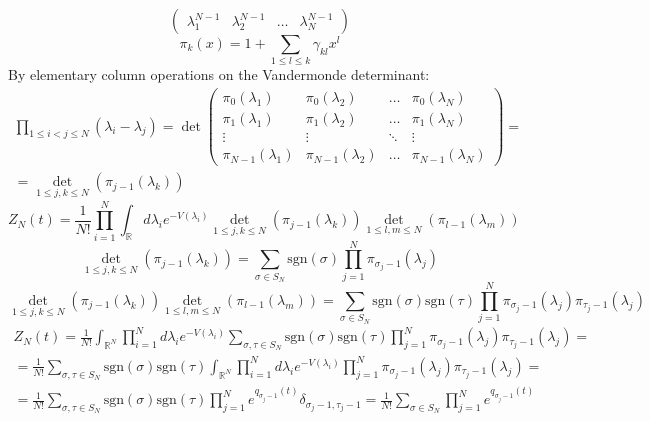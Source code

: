 \documentclass[12pt]{article}
\theoremstyle{definition}
\begin{document}
\begin{enumerate}
\begin{itemize}
\begin{equation}
\begin{pmatrix}
                \lambda^{N-1}_1 & \lambda^{N-1}_2 & \hdots & \lambda^{N-1}_N
            \end{pmatrix}
        \end{equation}
        \begin{equation}
            \pi_k(x)=1+\sum\limits_{1\leq l\leq k}\gamma_{kl}x^l
        \end{equation}
        By elementary column operations on the Vandermonde determinant:
        \begin{multline}
            \prod\limits_{1\leq i<j\leq N}(\lambda_i-\lambda_j)=\det\begin{pmatrix}
                \pi_0(\lambda_1) & \pi_0(\lambda_2) & \hdots & \pi_0(\lambda_N)\\
                \pi_1(\lambda_1) & \pi_1(\lambda_2) & \hdots & \pi_1(\lambda_N)\\
                \vdots & \vdots & \ddots & \vdots\\
                \pi_{N-1}(\lambda_1) & \pi_{N-1}(\lambda_2) & \hdots & \pi_{N-1}(\lambda_N)
            \end{pmatrix}=\\=\underset{1\leq j,k\leq N}{\det}(\pi_{j-1}(\lambda_k))
        \end{multline}
        \begin{equation}
            Z_N(t)=\frac{1}{N!}\prod\limits_{i=1}^N\int_{\mathbb{R}}d\lambda_ie^{-V(\lambda_i)}\underset{1\leq j,k\leq N}{\det}(\pi_{j-1}(\lambda_k))\underset{1\leq l,m\leq N}{\det}(\pi_{l-1}(\lambda_m))
        \end{equation}
        \begin{equation}
            \underset{1\leq j,k\leq N}{\det}(\pi_{j-1}(\lambda_k))=\sum\limits_{\sigma\in S_N}\text{sgn}(\sigma)\prod\limits_{j=1}^N\pi_{\sigma_j-1}(\lambda_j)
        \end{equation}
        \begin{equation}
            \underset{1\leq j,k\leq N}{\det}(\pi_{j-1}(\lambda_k))\underset{1\leq l,m\leq N}{\det}(\pi_{l-1}(\lambda_m))=\sum\limits_{\sigma\in S_N}\text{sgn}(\sigma)\text{sgn}(\tau)\prod\limits_{j=1}^N\pi_{\sigma_j-1}(\lambda_j)\pi_{\tau_j-1}(\lambda_j)
        \end{equation}
        \begin{multline}
            Z_N(t)=\frac{1}{N!}\int_{\mathbb{R}^N}\prod\limits_{i=1}^Nd\lambda_ie^{-V(\lambda_i)}\sum\limits_{\sigma,\tau\in S_N}\text{sgn}(\sigma)\text{sgn}(\tau)\prod\limits_{j=1}^N\pi_{\sigma_j-1}(\lambda_j)\pi_{\tau_j-1}(\lambda_j)=\\=\frac{1}{N!}\sum\limits_{\sigma,\tau\in S_N}\text{sgn}(\sigma)\text{sgn}(\tau)\int_{\mathbb{R}^N}\prod\limits_{i=1}^Nd\lambda_ie^{-V(\lambda_i)}\prod\limits_{j=1}^N\pi_{\sigma_j-1}(\lambda_j)\pi_{\tau_j-1}(\lambda_j)=\\=\frac{1}{N!}\sum\limits_{\sigma,\tau\in S_N}\text{sgn}(\sigma)\text{sgn}(\tau)\prod\limits_{j=1}^Ne^{q_{\sigma_j-1}(t)}\delta_{\sigma_j-1,\tau_j-1}=\frac{1}{N!}\sum\limits_{\sigma\in S_N}\prod\limits_{j=1}^Ne^{q_{\sigma_j-1}(t)}

\end{multline}
\end{itemize}
\end{enumerate}
\end{document}
